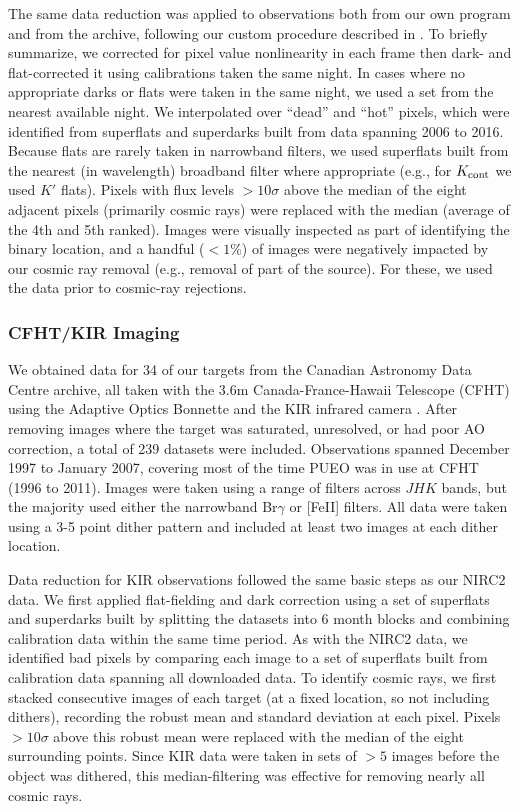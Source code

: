 \documentclass[twocolumn]{aastex62}
\begin{document}
The same data reduction was applied to observations both from our own program and from the archive, following our custom procedure described in \citet{Kraus2016a}. To briefly summarize, we corrected for pixel value nonlinearity in each frame then dark- and flat-corrected it using calibrations taken the same night. In cases where no appropriate darks or flats were taken in the same night, we used a set from the nearest available night. We interpolated over ``dead'' and ``hot'' pixels, which were identified from superflats and superdarks built from data spanning 2006 to 2016. Because flats are rarely taken in narrowband filters, we used superflats built from the nearest (in wavelength) broadband filter where appropriate (e.g., for $K_{\rm{cont}}$ we used $K'$ flats). Pixels with flux levels $>10\sigma$ above the median of the eight adjacent pixels (primarily cosmic rays) were replaced with the median (average of the 4th and 5th ranked). Images were visually inspected as part of identifying the binary location, and a handful ($<1\%$) of images were negatively impacted by our cosmic ray removal (e.g., removal of part of the source). For these, we used the data prior to cosmic-ray rejections.

\subsubsection{CFHT/KIR Imaging}

We obtained data for 34 of our targets from the Canadian Astronomy Data Centre archive, all taken with the 3.6m Canada-France-Hawaii Telescope (CFHT) using the Adaptive Optics Bonnette \citep[AOB, often referred to as PUEO after the Hawaiian owl,][]{1994SPIE.2201..833A} and the KIR infrared camera \citep{1998SPIE.3354..760D}. After removing images where the target was saturated, unresolved, or had poor AO correction, a total of 239 datasets were included. Observations spanned December 1997 to January 2007, covering most of the time PUEO was in use at CFHT (1996 to 2011). Images were taken using a range of filters across $JHK$ bands, but the majority used either the narrowband Br$\gamma$ or [FeII] filters. All data were taken using a 3-5 point dither pattern and included at least two images at each dither location. 

Data reduction for KIR observations followed the same basic steps as our NIRC2 data. We first applied flat-fielding and dark correction using a set of superflats and superdarks built by splitting the datasets into 6 month blocks and combining calibration data within the same time period. As with the NIRC2 data, we identified bad pixels by comparing each image to a set of superflats built from calibration data spanning all downloaded data. To identify cosmic rays, we first stacked consecutive images of each target (at a fixed location, so not including dithers), recording the robust mean and standard deviation at each pixel. Pixels $>10\sigma$ above this robust mean were replaced with the median of the eight surrounding points. Since KIR data were taken in sets of $>5$ images before the object was dithered, this median-filtering was effective for removing nearly all cosmic rays.
\end{document}
